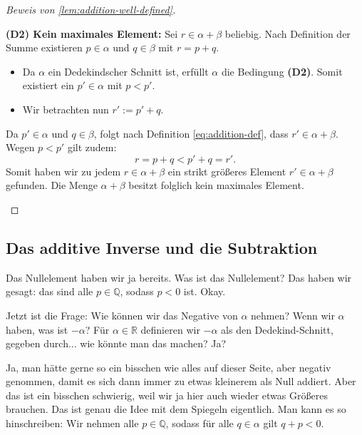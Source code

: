 \begin{proof}[Beweis von \cref{lem:addition-well-defined}]
\begin{math-stroke}
\textbf{(D2) Kein maximales Element:} Sei $r \in \alpha + \beta$ beliebig. Nach Definition der Summe existieren $p \in \alpha$ und $q \in \beta$ mit $r = p + q$.
\begin{itemize}
    \item Da $\alpha$ ein Dedekindscher Schnitt ist, erfüllt $\alpha$ die Bedingung \textbf{(D2)}. Somit existiert ein $p' \in \alpha$ mit $p < p'$.
    \item Wir betrachten nun $r' := p' + q$. 
\end{itemize}
Da $p' \in \alpha$ und $q \in \beta$, folgt nach Definition \eqref{eq:addition-def}, dass $r' \in \alpha + \beta$. Wegen $p < p'$ gilt zudem:
\[ r = p + q < p' + q = r'. \]
Somit haben wir zu jedem $r \in \alpha + \beta$ ein strikt größeres Element $r' \in \alpha + \beta$ gefunden. Die Menge $\alpha + \beta$ besitzt folglich kein maximales Element.
\end{math-stroke}
\end{proof}

\subsection{Das additive Inverse und die Subtraktion}

\begin{spoken-clean}[00:57:15 - 00:59:45]
Das Nullelement haben wir ja bereits. Was ist das Nullelement? Das haben wir gesagt: das sind alle $p \in \mathbb{Q}$, sodass $p < 0$ ist. Okay.

Jetzt ist die Frage: Wie können wir das Negative von $\alpha$ nehmen? Wenn wir $\alpha$ haben, was ist $-\alpha$? Für $\alpha \in \mathbb{R}$ definieren wir $-\alpha$ als den Dedekind-Schnitt, gegeben durch... wie könnte man das machen? Ja?
\end{spoken-clean}

\begin{student-interaction}
Ja, man hätte gerne so ein bisschen wie alles auf dieser Seite, aber negativ genommen, damit es sich dann immer zu etwas kleinerem als Null addiert. Aber das ist ein bisschen schwierig, weil wir ja hier auch wieder etwas Größeres brauchen. Das ist genau die Idee mit dem Spiegeln eigentlich. Man kann es so hinschreiben: Wir nehmen alle $p \in \mathbb{Q}$, sodass für alle $q \in \alpha$ gilt $q + p < 0$.
\end{student-interaction}

